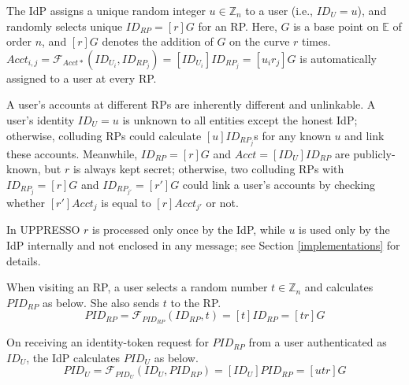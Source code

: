 The IdP assigns a unique random integer $u \in \mathbb{Z}_n$ to a user (i.e., $ID_U = u$),
 and randomly selects unique $ID_{RP} = [r]G$ for an RP. %
Here, $G$ is a base point on $\mathbb{E}$ of order $n$, and $[r]G$ denotes the addition of $G$ on the curve $r$ times.
$Acct_{i,j} = \mathcal{F}_{Acct\ast}(ID_{U_i}, ID_{RP_j})= [ID_{U_i}]ID_{RP_j} =[u_ir_j]G$ is automatically assigned to a user at every RP.

A user's accounts at different RPs are inherently different and unlinkable.
A user's identity $ID_U = u$ is unknown to all entities except the honest IdP; otherwise, colluding RPs could calculate $[u]ID_{RP_j}$s for any known $u$ and link these accounts.
Meanwhile, $ID_{RP} = [r]G$ and $Acct = [ID_U]ID_{RP}$ are publicly-known,
 but $r$ is always kept secret;
otherwise, two colluding RPs with $ID_{RP_j} = [r]G$ and $ID_{RP_{j'}} = [r']G$ could link a user's accounts by checking whether $[r']Acct_j$ is equal to $[r]Acct_{j'}$ or not.

In UPPRESSO $r$ is processed only once by the IdP,
    while $u$ is used only by the IdP internally and
 not enclosed in any message; see Section \ref{implementations} for details.


 When visiting an RP,
a user selects a random number $t \in \mathbb{Z}_n$
    and calculates $PID_{RP}$ as below. She also sends $t$ to the RP.
\begin{equation}
PID_{RP} = \mathcal{F}_{PID_{RP}}(ID_{RP},t) = [t]{ID_{RP}} = [tr]G
\label{equ:PIDRP}
\end{equation}



On receiving an identity-token request for $PID_{RP}$ from a user authenticated as $ID_U$, the IdP calculates $PID_{U}$ as below.
\begin{equation}
PID_{U} = \mathcal{F}_{PID_U}(ID_U, PID_{RP}) =
  [{ID_U}]{PID_{RP}} = [utr]G
 \label{equ:PIDU}
\end{equation}


